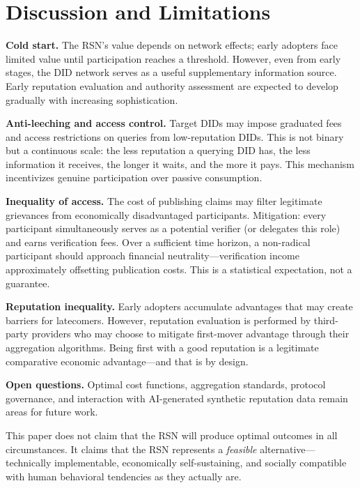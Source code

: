 \documentclass[11pt,a4paper,twocolumn]{article}
\begin{document}
\section{Discussion and Limitations}

\textbf{Cold start.} The RSN's value depends on network effects; early adopters face limited value until participation reaches a threshold. However, even from early stages, the DID network serves as a useful supplementary information source. Early reputation evaluation and authority assessment are expected to develop gradually with increasing sophistication.

\textbf{Anti-leeching and access control.} Target DIDs may impose graduated fees and access restrictions on queries from low-reputation DIDs. This is not binary but a continuous scale: the less reputation a querying DID has, the less information it receives, the longer it waits, and the more it pays. This mechanism incentivizes genuine participation over passive consumption.

\textbf{Inequality of access.} The cost of publishing claims may filter legitimate grievances from economically disadvantaged participants. Mitigation: every participant simultaneously serves as a potential verifier (or delegates this role) and earns verification fees. Over a sufficient time horizon, a non-radical participant should approach financial neutrality---verification income approximately offsetting publication costs. This is a statistical expectation, not a guarantee.

\textbf{Reputation inequality.} Early adopters accumulate advantages that may create barriers for latecomers. However, reputation evaluation is performed by third-party providers who may choose to mitigate first-mover advantage through their aggregation algorithms. Being first with a good reputation is a legitimate comparative economic advantage---and that is by design.

\textbf{Open questions.} Optimal cost functions, aggregation standards, protocol governance, and interaction with AI-generated synthetic reputation data remain areas for future work.

This paper does not claim that the RSN will produce optimal outcomes in all circumstances. It claims that the RSN represents a \emph{feasible} alternative---technically implementable, economically self-sustaining, and socially compatible with human behavioral tendencies as they actually are.
\end{document}
